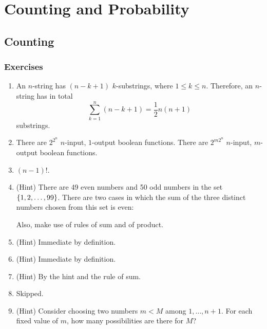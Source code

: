 \setcounter{chapter}{2}
\chapter{Counting and Probability}
\section{Counting}
\subsection*{Exercises}
\begin{enumerate}[\thesection-1]
%
\item An $n$-string has $(n - k + 1)$ $k$-substrings, where $1 \leq k \leq n$. Therefore, an $n$-string has in total
\[
\sum^n_{k = 1} (n - k + 1) = \frac{1}{2}n(n + 1)
\]
substrings.
%
\item There are $2^{2^n}$ $n$-input, $1$-output boolean functions. There are $2^{m2^n}$ $n$-input, $m$-output boolean functions.
%
\item $(n - 1)!$.
%
\item (Hint) There are 49 even numbers and 50 odd numbers in the set $\left\{1, 2, \ldots, 99\right\}$. There are two cases in which the sum of the three distinct numbers chosen from this set is even:  Also, make use of rules of sum and of product.
%
\item (Hint) Immediate by definition.
%
\item (Hint) Immediate by definition.
%
\item (Hint) By the hint and the rule of sum.
%
\item Skipped.
%
\item (Hint) Consider choosing two numbers $m < M$ among $1, \ldots, n + 1$. For each fixed value of $m$, how many possibilities are there for $M$?
%
\end{enumerate}
